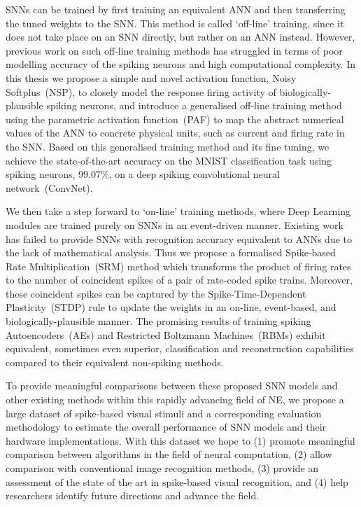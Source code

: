 SNNs can be trained by first training an equivalent ANN and then transferring the tuned weights to the SNN.
This method is called `off-line' training, since it does not take place on an SNN directly, but rather on an ANN instead.
However, previous work on such off-line training methods has struggled in terms of poor modelling accuracy of the spiking neurons and high computational complexity.
In this thesis we propose a simple and novel activation function, Noisy Softplus~(NSP), to closely model the response firing activity of biologically-plausible spiking neurons,
and introduce a generalised off-line training method using the parametric activation function~(PAF) to map the abstract numerical values of the ANN to concrete physical units, such as current and firing rate in the SNN.
Based on this generalised training method and its fine tuning, we achieve the state-of-the-art accuracy on the MNIST classification task using spiking neurons, 99.07\%, on a deep spiking convolutional neural network~(ConvNet).


We then take a step forward to `on-line' training methods, where Deep Learning modules are trained purely on SNNs in an event-driven manner.
Existing work has failed to provide SNNs with recognition accuracy equivalent to ANNs due to the lack of mathematical analysis. 
Thus we propose a formalised Spike-based Rate Multiplication~(SRM) method which transforms the product of firing rates to the number of coincident spikes of a pair of rate-coded spike trains.
Moreover, these coincident spikes can be captured by the Spike-Time-Dependent Plasticity~(STDP) rule to update the weights in an on-line, event-based, and biologically-plausible manner.
The promising results of training spiking Autoencoders~(AEs) and Restricted Boltzmann Machines~(RBMs) exhibit equivalent, sometimes even superior, classification and reconstruction capabilities compared to their equivalent non-spiking methods.

To provide meaningful comparisons between these proposed SNN models and other existing methods within this rapidly advancing field of NE, we propose a large dataset of spike-based visual stimuli and a corresponding evaluation methodology to estimate the overall performance of SNN models and their hardware implementations.
With this dataset we hope to (1) promote meaningful comparison between algorithms in the field of neural computation, (2) allow comparison with conventional image recognition methods, (3) provide an assessment of the state of the art in spike-based visual recognition, and (4) help researchers identify future directions and advance the field.

